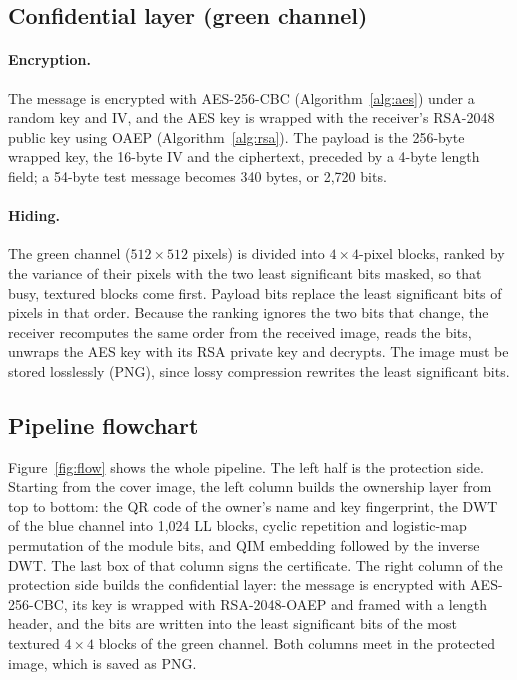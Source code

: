 \documentclass[11pt,a4paper]{article}
\begin{document}
\subsection{Confidential layer (green channel)}

\paragraph{Encryption.} The message is encrypted with AES-256-CBC (Algorithm~\ref{alg:aes}) under a random key and IV, and the AES key is wrapped with the receiver's RSA-2048 public key using OAEP (Algorithm~\ref{alg:rsa}). The payload is the 256-byte wrapped key, the 16-byte IV and the ciphertext, preceded by a 4-byte length field; a 54-byte test message becomes 340 bytes, or 2,720 bits.

\paragraph{Hiding.} The green channel ($512\times512$ pixels) is divided into $4\times4$-pixel blocks, ranked by the variance of their pixels with the two least significant bits masked, so that busy, textured blocks come first. Payload bits replace the least significant bits of pixels in that order. Because the ranking ignores the two bits that change, the receiver recomputes the same order from the received image, reads the bits, unwraps the AES key with its RSA private key and decrypts. The image must be stored losslessly (PNG), since lossy compression rewrites the least significant bits.

\subsection{Pipeline flowchart}

Figure~\ref{fig:flow} shows the whole pipeline. The left half is the protection side. Starting from the cover image, the left column builds the ownership layer from top to bottom: the QR code of the owner's name and key fingerprint, the DWT of the blue channel into 1,024 LL blocks, cyclic repetition and logistic-map permutation of the module bits, and QIM embedding followed by the inverse DWT. The last box of that column signs the certificate. The right column of the protection side builds the confidential layer: the message is encrypted with AES-256-CBC, its key is wrapped with RSA-2048-OAEP and framed with a length header, and the bits are written into the least significant bits of the most textured $4\times4$ blocks of the green channel. Both columns meet in the protected image, which is saved as PNG.
\end{document}
